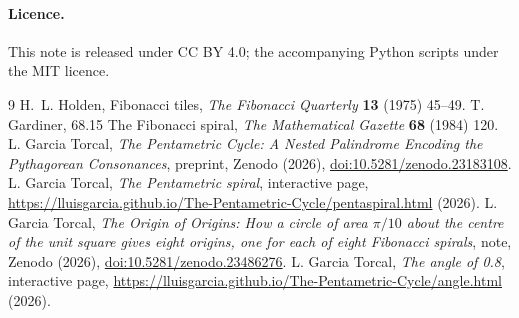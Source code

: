 \documentclass[11pt,a4paper]{article}
\theoremstyle{plain}
\theoremstyle{definition}
\theoremstyle{remark}
\begin{document}
\paragraph{Licence.} This note is released under CC BY 4.0; the accompanying Python scripts under the MIT licence.

\begin{thebibliography}{9}
 H.~L. Holden, Fibonacci tiles, \emph{The Fibonacci Quarterly} \textbf{13} (1975) 45--49.
 T. Gardiner, 68.15 The Fibonacci spiral, \emph{The Mathematical Gazette} \textbf{68} (1984) 120.
 L. Garcia Torcal, \emph{The Pentametric Cycle: A Nested Palindrome Encoding the Pythagorean Consonances}, preprint, Zenodo (2026), \href{https://doi.org/10.5281/zenodo.23183108}{doi:10.5281/zenodo.23183108}.
 L. Garcia Torcal, \emph{The Pentametric spiral}, interactive page, \url{https://lluisgarcia.github.io/The-Pentametric-Cycle/pentaspiral.html} (2026).
 L. Garcia Torcal, \emph{The Origin of Origins: How a circle of area $\pi/10$ about the centre of the unit square gives eight origins, one for each of eight Fibonacci spirals}, note, Zenodo (2026), \href{https://doi.org/10.5281/zenodo.23486276}{doi:10.5281/zenodo.23486276}.
 L. Garcia Torcal, \emph{The angle of 0.8}, interactive page, \url{https://lluisgarcia.github.io/The-Pentametric-Cycle/angle.html} (2026).
\end{thebibliography}
\end{document}
